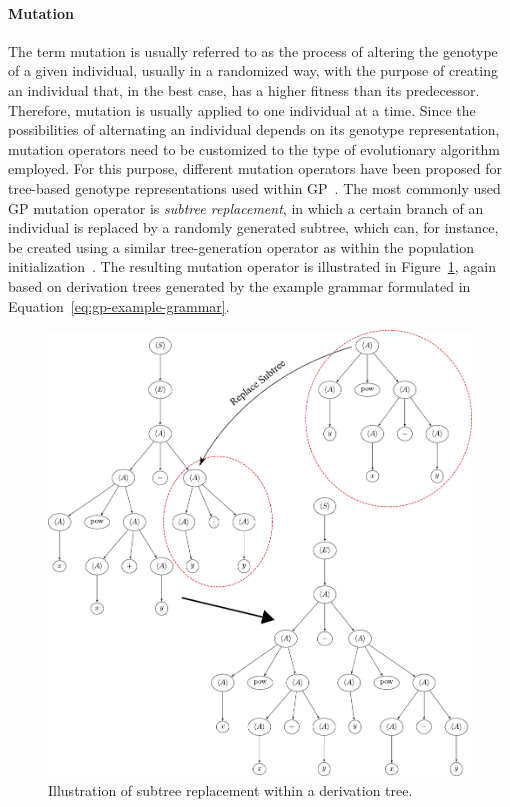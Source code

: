 \paragraph{Mutation}
The term mutation is usually referred to as the process of altering the genotype of a given individual, usually in a randomized way, with the purpose of creating an individual that, in the best case, has a higher fitness than its predecessor.
Therefore, mutation is usually applied to one individual at a time.
Since the possibilities of alternating an individual depends on its genotype representation, mutation operators need to be customized to the type of evolutionary algorithm employed.
For this purpose, different mutation operators have been proposed for tree-based genotype representations used within GP~\cite{poli2008field,koza1994genetic}.
The most commonly used GP mutation operator is \emph{subtree replacement}, in which a certain branch of an individual is replaced by a randomly generated subtree, which can, for instance, be created using a similar tree-generation operator as within the population initialization~\cite{poli2008field}.
The resulting mutation operator is illustrated in Figure~\ref{fig:gp-replacement-mutation}, again based on derivation trees generated by the example grammar formulated in Equation~\eqref{eq:gp-example-grammar}.
\begin{figure}
	\centering
	\includegraphics[scale=0.4]{figures/trees/subtree_mutation.pdf}
	\caption{Illustration of subtree replacement within a derivation tree.}
	\label{fig:gp-replacement-mutation}
\end{figure}
